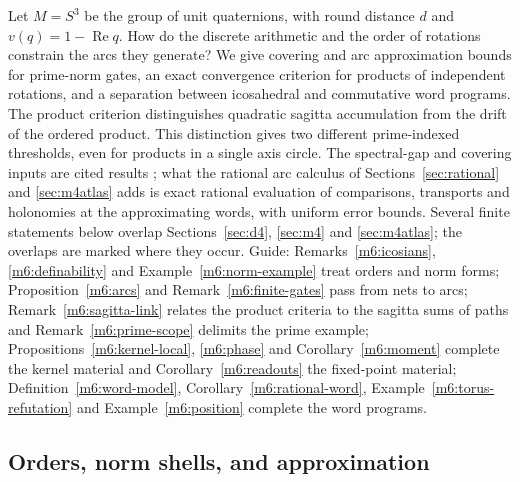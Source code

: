 \documentclass[11pt,reqno]{amsart}
\theoremstyle{definition}
\theoremstyle{remark}
\numberwithin{equation}{section}
\newcommand{\re}{\operatorname{Re}}
\begin{document}
Let \(M=S^3\) be the group of unit quaternions, with round distance \(d\)
and \(v(q)=1-\re q\). How do the discrete arithmetic and the order of
rotations constrain the arcs they generate? We give covering and arc
approximation bounds for prime-norm gates, an exact convergence criterion
for products of independent rotations, and a separation between
icosahedral and commutative word programs. The product criterion
distinguishes quadratic sagitta accumulation from the drift of the
ordered product. This distinction gives two different prime-indexed
thresholds, even for products in a single axis circle.  The spectral-gap and covering inputs are cited results
\cite{m6:LPS,m6:PS,m6:Sardari}; what the rational arc calculus of Sections~\ref{sec:rational} and \ref{sec:m4atlas} adds is exact
rational evaluation of comparisons, transports and holonomies at the approximating words, with uniform error bounds.  Several finite
statements below overlap Sections~\ref{sec:d4}, \ref{sec:m4} and \ref{sec:m4atlas}; the overlaps are marked where they occur.  Guide:
Remarks~\ref{m6:icosians}, \ref{m6:definability} and Example~\ref{m6:norm-example} treat orders and norm forms; Proposition~\ref{m6:arcs}
and Remark~\ref{m6:finite-gates} pass from nets to arcs; Remark~\ref{m6:sagitta-link} relates the product criteria to the sagitta sums
of paths and Remark~\ref{m6:prime-scope} delimits the prime example; Propositions~\ref{m6:kernel-local}, \ref{m6:phase} and
Corollary~\ref{m6:moment} complete the kernel material and Corollary~\ref{m6:readouts} the fixed-point material;
Definition~\ref{m6:word-model}, Corollary~\ref{m6:rational-word}, Example~\ref{m6:torus-refutation} and Example~\ref{m6:position} complete
the word programs.

\subsection{Orders, norm shells, and approximation}
\end{document}
